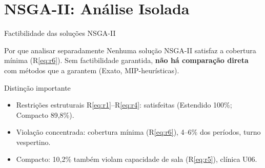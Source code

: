 \section{NSGA-II: Análise Isolada}

\begin{frame}{Factibilidade das soluções NSGA-II}

    \begingroup
    \begin{block}{Por que analisar separadamente}
        Nenhuma solução NSGA-II satisfaz a cobertura mínima (R\ref{eq:r6}). Sem factibilidade garantida, \textbf{não há comparação direta} com métodos que a garantem (Exato, MIP-heurísticas).
    \end{block}
    \endgroup

    \begin{block}{Distinção importante}
        \begin{itemize}
            \item Restrições estruturais R\ref{eq:r1}--R\ref{eq:r4}: satisfeitas (Estendido 100\%; Compacto 89,8\%).
            \item Violação concentrada: cobertura mínima (R\ref{eq:r6}), 4--6\% dos períodos, turno vespertino.
            \item Compacto: 10,2\% também violam capacidade de sala (R\ref{eq:r5}), clínica U06.
        \end{itemize}
    \end{block}
\end{frame}

